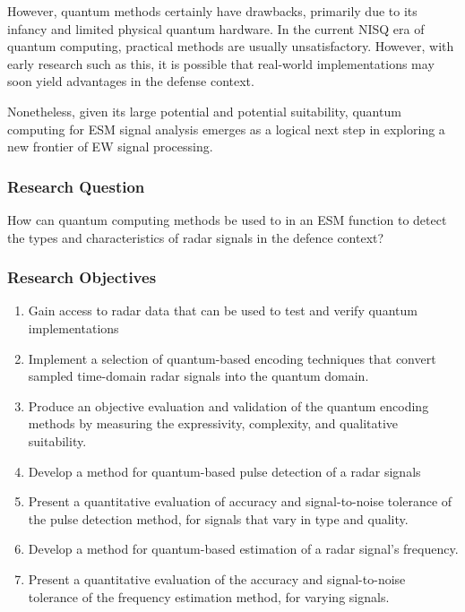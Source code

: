 However, quantum methods certainly have drawbacks, primarily due to its infancy and limited physical quantum hardware.
In the current \ac{NISQ} era of quantum computing, practical methods are usually unsatisfactory.
However, with early research such as this, it is possible that real-world implementations may soon yield advantages in the defense context.

Nonetheless, given its large potential and potential suitability, quantum computing for \ac{ESM} signal analysis emerges as a logical next step in exploring a new frontier of \ac{EW} signal processing.

\subsubsection{Research Question}
How can quantum computing methods be used to in an \ac{ESM} function to detect the types and characteristics of radar signals in the defence context?

\subsubsection{Research Objectives}
\begin{enumerate}[label=Obj. \arabic*]
    \item Gain access to radar data that can be used to test and verify quantum implementations
    \item Implement a selection of quantum-based encoding techniques that convert sampled time-domain radar signals into the quantum domain.
    \item Produce an objective evaluation and validation of the quantum encoding methods by measuring the expressivity, complexity, and qualitative suitability.
    \item Develop a method for quantum-based pulse detection of a radar signals
    \item Present a quantitative evaluation of accuracy and signal-to-noise tolerance of the pulse detection method, for signals that vary in type and quality.
    \item Develop a method for quantum-based estimation of a radar signal's frequency.
    \item Present a quantitative evaluation of the accuracy and signal-to-noise tolerance of the frequency estimation method, for varying signals.
\end{enumerate}

